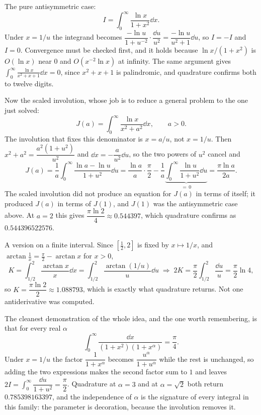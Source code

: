 \begin{worked}
The pure antisymmetric case:
\[
I=\int_0^{\infty}\frac{\ln x}{1+x^2}\dd x .
\]
Under $x=1/u$ the integrand becomes $\dfrac{-\ln u}{1+u^{-2}}\cdot\dfrac{\dd u}{u^2}=\dfrac{-\ln u}{u^2+1}\dd u$, so $I=-I$ and $I=0$. Convergence must be checked first, and it holds because $\ln x/(1+x^2)$ is $O(\ln x)$ near $0$ and $O(x^{-2}\ln x)$ at infinity. The same argument gives $\displaystyle\int_0^{\infty}\frac{\ln x}{x^2+x+1}\dd x=0$, since $x^2+x+1$ is palindromic, and quadrature confirms both to twelve digits.

Now the scaled involution, whose job is to reduce a general problem to the one just solved:
\[
J(a)=\int_0^{\infty}\frac{\ln x}{x^2+a^2}\dd x,\qquad a>0 .
\]
The involution that fixes this denominator is $x=a/u$, not $x=1/u$. Then $x^2+a^2=\dfrac{a^2(1+u^2)}{u^2}$ and $\dd x=-\dfrac{a}{u^2}\dd u$, so the two powers of $u^2$ cancel and
\[
J(a)=\frac1a\int_0^{\infty}\frac{\ln a-\ln u}{1+u^2}\dd u
=\frac{\ln a}{a}\cdot\frac{\pi}{2}-\frac1a\underbrace{\int_0^{\infty}\frac{\ln u}{1+u^2}\dd u}_{=\,0}
=\frac{\pi\ln a}{2a}.
\]
The scaled involution did not produce an equation for $J(a)$ in terms of itself; it produced $J(a)$ in terms of $J(1)$, and $J(1)$ was the antisymmetric case above. At $a=2$ this gives $\dfrac{\pi\ln2}{4}\approx0.544397$, which quadrature confirms as $0.544396522576$.

A version on a finite interval. Since $[\tfrac12,2]$ is fixed by $x\mapsto1/x$, and $\arctan\tfrac1x=\tfrac\pi2-\arctan x$ for $x>0$,
\[
K=\int_{1/2}^{2}\frac{\arctan x}{x}\dd x=\int_{1/2}^{2}\frac{\arctan(1/u)}{u}\dd u
\;\Longrightarrow\;
2K=\frac{\pi}{2}\int_{1/2}^{2}\frac{\dd u}{u}=\frac{\pi}{2}\ln4 ,
\]
so $K=\dfrac{\pi\ln2}{2}\approx1.088793$, which is exactly what quadrature returns. Not one antiderivative was computed.

The cleanest demonstration of the whole idea, and the one worth remembering, is that for every real $\alpha$
\[
\int_0^{\infty}\frac{\dd x}{(1+x^2)(1+x^{\alpha})}=\frac{\pi}{4}.
\]
Under $x=1/u$ the factor $\dfrac{1}{1+x^{\alpha}}$ becomes $\dfrac{u^{\alpha}}{1+u^{\alpha}}$ while the rest is unchanged, so adding the two expressions makes the second factor sum to $1$ and leaves $2I=\int_0^\infty\dfrac{\dd u}{1+u^2}=\dfrac{\pi}{2}$. Quadrature at $\alpha=3$ and at $\alpha=\sqrt2$ both return $0.785398163397$, and the independence of $\alpha$ is the signature of every integral in this family: the parameter is decoration, because the involution removes it.
\end{worked}


